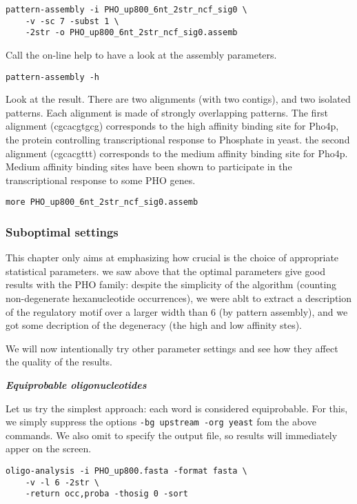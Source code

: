\begin{verbatim}
pattern-assembly -i PHO_up800_6nt_2str_ncf_sig0 \
    -v -sc 7 -subst 1 \
    -2str -o PHO_up800_6nt_2str_ncf_sig0.assemb
\end{verbatim}


Call the on-line help to have a look at the assembly parameters. 
\begin{verbatim}
pattern-assembly -h
\end{verbatim}

Look at the result. There are two alignments (with two contigs), and
two isolated patterns. Each alignment is made of strongly overlapping
patterns. The first alignment (cgcacgtgcg) corresponds to the high
affinity binding site for Pho4p, the protein controlling
transcriptional response to Phosphate in yeast. the second alignment
(cgcacgttt) corresponds to the medium affinity binding site for
Pho4p. Medium affinity binding sites have been shown to participate in
the transcriptional response to some PHO genes.

\begin{verbatim}
more PHO_up800_6nt_2str_ncf_sig0.assemb
\end{verbatim}

\subsubsection{Suboptimal settings}

This chapter only aims at emphasizing how crucial is the choice of
appropriate statistical parameters. we saw above that the optimal
parameters give good results with the PHO family: despite the
simplicity of the algorithm (counting non-degenerate hexanucleotide
occurrences), we were ablt to extract a description of the regulatory
motif over a larger width than 6 (by pattern assembly), and we got
some decription of the degeneracy (the high and low affinity stes).

We will now intentionally try other parameter settings and see how
they affect the quality of the results.

\textit{\textbf{Equiprobable oligonucleotides}}

Let us try the simplest approach: each word is considered
equiprobable. For this, we simply suppress the options
\texttt{-bg upstream -org yeast} fom the above commands. We
also omit to specify the output file, so results will immediately
apper on the screen.

\begin{verbatim} 
oligo-analysis -i PHO_up800.fasta -format fasta \ 
    -v -l 6 -2str \
    -return occ,proba -thosig 0 -sort 
\end{verbatim}

